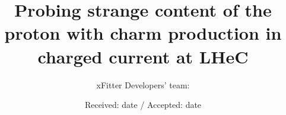 \documentclass[pdftex,twocolumn,epjc3]{svjour3}          %
\begin{document}
\sloppy

\title{Probing strange content of the proton with charm production in charged current at LHeC}


\author{xFitter Developers' team:
}


\date{Received: date / Accepted: date}

\maketitle
\end{document}
